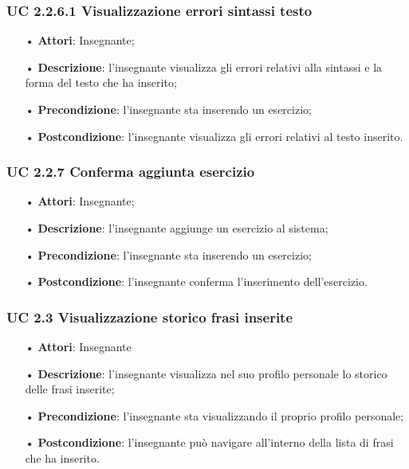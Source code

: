 \subsubsection{UC 2.2.6.1 Visualizzazione errori sintassi testo}
\begin{itemize}
	\item[•] \textbf{Attori}: Insegnante;
	\item[•] \textbf{Descrizione}: l'insegnante visualizza gli errori relativi alla sintassi e la forma del testo che ha inserito;
	\item[•] \textbf{Precondizione}: l'insegnante sta inserendo un esercizio;
	\item[•] \textbf{Postcondizione}: l’insegnante visualizza gli errori relativi al testo inserito.
\end{itemize}

\subsubsection{UC 2.2.7 Conferma aggiunta esercizio}
\begin{itemize}
	\item[•] \textbf{Attori}: Insegnante;
	\item[•] \textbf{Descrizione}: l'insegnante aggiunge un esercizio al sistema;
	\item[•] \textbf{Precondizione}: l’insegnante sta inserendo un esercizio;
	\item[•] \textbf{Postcondizione}: l'insegnante conferma l'inserimento dell'esercizio.
\end{itemize}






\subsubsection{UC 2.3 Visualizzazione storico frasi inserite}


\begin{itemize}
	\item[•] \textbf{Attori}: Insegnante	   
	\item[•] \textbf{Descrizione}: l’insegnante visualizza nel suo profilo personale lo storico delle frasi inserite; 
	\item[•] \textbf{Precondizione}: l'insegnante sta visualizzando il proprio profilo personale;
	\item[•] \textbf{Postcondizione}: l’insegnante può navigare all’interno della lista di frasi che ha inserito.
\end{itemize}

